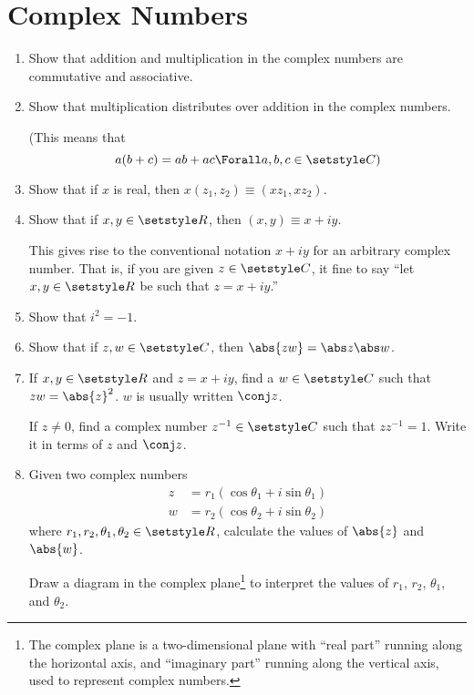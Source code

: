 \section{Complex Numbers}

\begin{enumerate}
 \item
  Show that addition and multiplication in the complex numbers are commutative
  and associative.
 \item
  Show that multiplication distributes over addition in the complex numbers.

  (This means that
  \begin{equation*}
   a(b + c) = ab + ac \Forall a, b, c \in \Complex)
  \end{equation*}
 \item
  Show that if \(x\) is real, then \(x(z_1, z_2) \equiv (x z_1, x z_2)\).
 \item
  Show that if \(x, y \in \Reals\), then \((x, y) \equiv x + i y\).

  This gives rise to the conventional notation \(x + iy\) for an arbitrary
  complex number. That is, if you are given \(z \in \Complex\), it fine to say
  ``let \(x, y \in \Reals\) be such that \(z = x + iy\).''
 \item
  Show that \(i^2 = -1\).
 \item
  Show that if \(z, w \in \Complex\), then \(\abs{zw} = \abs z \abs w\).
 \item
  If \(x, y \in \Reals\) and \(z = x + iy\), find a \(w \in \Complex\) such that
  \(zw = \abs{z}^2\). \(w\) is usually written \(\conj z\).

  If \(z \ne 0\), find a complex number \(z^{-1} \in \Complex\) such that
  \(zz^{-1} = 1\). Write it in terms of \(z\) and \(\conj z\).
 \item
  Given two complex numbers
  \begin{align*}
   z &= r_1(\cos \theta_1 + i \sin \theta_1) \\
   w &= r_2(\cos \theta_2 + i \sin \theta_2)
  \end{align*}
  where \(r_1, r_2, \theta_1, \theta_2 \in \Reals\),
  calculate the values of \(\abs{z}\) and \(\abs{w}\).

  Draw a diagram in the complex plane\footnote{
   The complex plane is a two-dimensional plane with ``real part'' running along
   the horizontal axis, and ``imaginary part'' running along the vertical axis,
   used to represent complex numbers.
  } to interpret the values of
  \(r_1\), \(r_2\), \(\theta_1\), and \(\theta_2\).


\end{enumerate}
